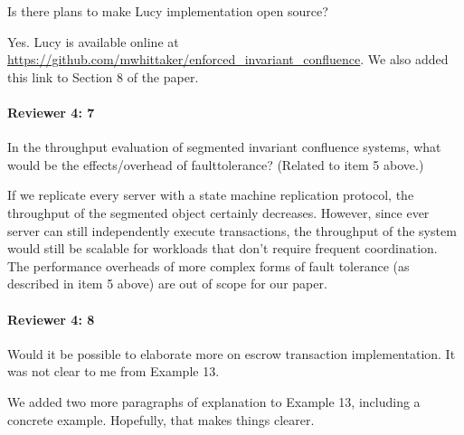\documentclass[9pt]{article}
\begin{document}
\begin{multicols*}{2}
\begin{feedback}
  Is there plans to make Lucy implementation open source?
\end{feedback}
Yes. Lucy is available online at
\url{https://github.com/mwhittaker/enforced_invariant_confluence}. We also
added this link to Section 8 of the paper.

\paragraph{Reviewer 4: 7}
\begin{feedback}
  In the throughput evaluation of segmented invariant confluence systems, what
  would be the effects/overhead of faulttolerance? (Related to item 5 above.)
\end{feedback}
If we replicate every server with a state machine replication protocol, the
throughput of the segmented \invariantconfluent{} object certainly
decreases. However, since ever server can still independently execute
transactions, the throughput of the system would still be scalable for
workloads that don't require frequent coordination.
%
The performance overheads of more complex forms of fault tolerance (as
described in item 5 above) are out of scope for our paper.

\paragraph{Reviewer 4: 8}
\begin{feedback}
  Would it be possible to elaborate more on escrow transaction implementation.
  It was not clear to me from Example 13.
\end{feedback}
We added two more paragraphs of explanation to Example 13, including a concrete
example. Hopefully, that makes things clearer.



\end{multicols*}
\end{document}
